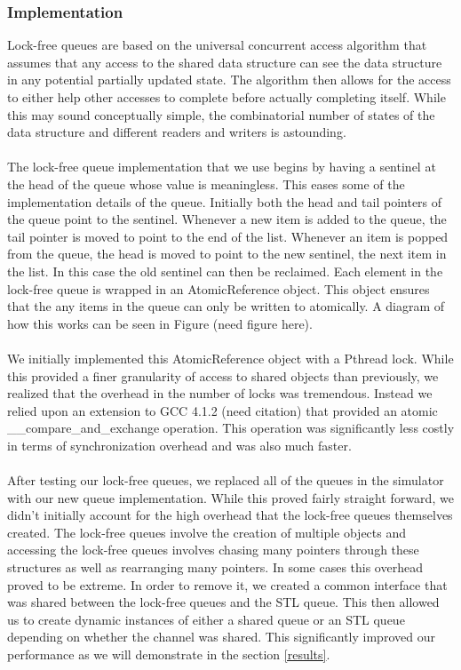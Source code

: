 \documentclass[twocolumn]{article}
\begin{document}
\subsubsection{Implementation}
Lock-free queues are based on the universal concurrent access algorithm
\cite{LF} that assumes that any access to the shared data structure can
see the data structure in any potential partially updated state.  The
algorithm then allows for the access to either help other accesses to
complete before actually completing itself.  While this may sound
conceptually simple, the combinatorial number of states of the data
structure and different readers and writers is astounding.\\
~\\
The lock-free queue implementation that we use begins by having a sentinel
at the head of the queue whose value is meaningless.  This eases some of
the implementation details of the queue.  Initially both the head and tail
pointers of the queue point to the sentinel.  Whenever a new item is added
to the queue, the tail pointer is moved to point to the end of the list.
Whenever an item is popped from the queue, the head is moved to point to
the new sentinel, the next item in the list.  In this case the old
sentinel can then be reclaimed.  Each element in the lock-free queue is
wrapped in an AtomicReference object.  This object ensures that the any
items in the queue can only be written to atomically.  A diagram of how
this works can be seen in Figure (need figure here).\\
~\\
We initially implemented this AtomicReference object with a Pthread
lock.  While this provided a finer granularity of access to shared
objects than previously, we realized that the overhead in the number of
locks was tremendous.  Instead we relied upon an extension to GCC 4.1.2
(need citation) that provided an atomic \_\_compare\_and\_exchange operation.
This operation was significantly less costly in terms of synchronization
overhead and was also much faster.\\
~\\
After testing our lock-free queues, we replaced all of
the queues in the simulator with our new queue implementation.  While this
proved fairly straight forward, we didn't initially account for the high
overhead that the lock-free queues themselves created.  The lock-free
queues involve the creation of multiple objects and accessing the
lock-free queues involves chasing many pointers through these structures
as well as rearranging many pointers.  In some cases this overhead proved
to be extreme.  In order to remove it, we created a common interface that
was shared between the lock-free queues and the STL queue.  This then
allowed us to create dynamic instances of either a shared queue or an STL
queue depending on whether the channel was shared.  This significantly
improved our performance as we will demonstrate in the section \ref{results}.
\end{document}
